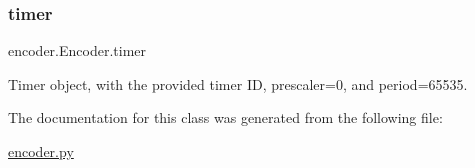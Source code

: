 \subsubsection{\texorpdfstring{timer}{timer}}
{\footnotesize\ttfamily encoder.\+Encoder.\+timer}



Timer object, with the provided timer ID, prescaler=0, and period=65535. 



The documentation for this class was generated from the following file\+:\begin{DoxyCompactItemize}
\item 
\mbox{\hyperlink{encoder_8py}{encoder.\+py}}\end{DoxyCompactItemize}
